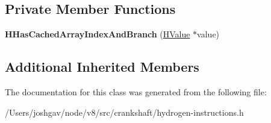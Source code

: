 \subsection*{Private Member Functions}
\begin{DoxyCompactItemize}
\item 
{\bfseries H\+Has\+Cached\+Array\+Index\+And\+Branch} (\hyperlink{classv8_1_1internal_1_1_h_value}{H\+Value} $\ast$value)\hypertarget{classv8_1_1internal_1_1_h_has_cached_array_index_and_branch_a8643d91a224aba40a176d4f07a06dbae}{}\label{classv8_1_1internal_1_1_h_has_cached_array_index_and_branch_a8643d91a224aba40a176d4f07a06dbae}

\end{DoxyCompactItemize}
\subsection*{Additional Inherited Members}


The documentation for this class was generated from the following file\+:\begin{DoxyCompactItemize}
\item 
/\+Users/joshgav/node/v8/src/crankshaft/hydrogen-\/instructions.\+h\end{DoxyCompactItemize}
